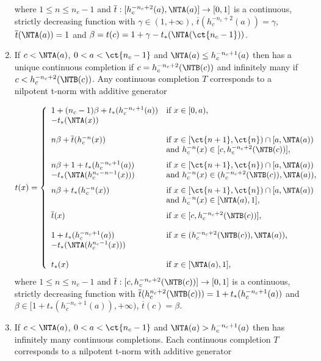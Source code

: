 \begin{theorem}
\begin{enumerate}[label=(\roman*)]
\begin{equation}
		\end{equation}
		where $1\leq n \leq n_c-1$ and $\overline{t}:[h_c^{-n_c+2}(a),\NTA(a)] \to [0,1]$ is a continuous, strictly decreasing function with $\gamma \in (1,+\infty)$, $\overline{t}(h_c^{-n_c+2}(a))=\gamma$, $\overline{t}(\NTA(a))=1$ and $\beta= t(c)= 1 + \gamma - t_*(\NTA(\ct{n_c-1}))$.
		\newline
		\item If $c< \NTA(a)$, $0<a<\ct{n_c-1}$ and $\NTA(a) \leq h_c^{-n_c+1}(a)$ then \TB has a unique continuous completion if $c=h_c^{-n_c+2}(\NTB(c))$ and infinitely many if $c < h_c^{-n_c+2}(\NTB(c))$. Any continuous completion $T$ corresponds to a nilpotent t-norm with additive generator
		
		\begin{equation}\label{eq:GeneratorCompletion(a,1)c-4}
			t(x)
			=
			\left\{ \begin{array}{ll}
				1+(n_c-1)\beta + t_*(h_c^{-n_c+1}(a))  & \text{if } x \in [0,a), \\
				 - t_*(\NTA(x))  & \\
				& \\
				n \beta + \overline{t}(h_c^{-n}(x))  & \text{if } x \in [\ct{n+1},\ct{n}) \cap [a,\NTA(a)) \\
				& \text{and } h_c^{-n}(x) \in [c,h_c^{-n_c+2}(\NTB(c))], \\[7pt]
				n \beta + 1 + t_*(h_c^{-n_c+1}(a))  & \text{if } x \in [\ct{n+1},\ct{n}) \cap [a,\NTA(a))\\
				- t_*(\NTA(h_c^{n_c-n-1}(x)))& \text{and } h_c^{-n}(x) \in (h_c^{-n_c+2}(\NTB(c)),\NTA(a)), \\[7pt]
				n \beta + t_*(h_c^{-n}(x))  & \text{if } x \in [\ct{n+1},\ct{n}) \cap [a,\NTA(a))\\
				& \text{and } h_c^{-n}(x) \in [\NTA(a),1], \\[7pt]
				\overline{t}(x) & \text{if } x \in [c,h_c^{-n_c+2}(\NTB(c))], \\
				& \\
				1+t_*(h_c^{-n_c+1}(a)) & \text{if } x \in (h_c^{-n_c+2}(\NTB(c)),\NTA(a)),\\
				-t_*(\NTA(h_c^{n_c-1}(x))) & \\
				& \\
				t_{*}(x) & \text{if } x \in [\NTA(a),1],
			\end{array} \right.
		\end{equation}	
		\newpage	
		where $1\leq n \leq n_c-1$ and $\overline{t}:[c,h_c^{-n_c+2}(\NTB(c))] \to [0,1]$ is a continuous, strictly decreasing function with  $\overline{t}(h_c^{n_c+2}(\NTB(c))) = 1 + t_*(h_c^{-n_c+1}(a))$ and $\beta \in [1 + t_*(h_c^{-n_c+1}(a)),+\infty)$, $\overline{t}(c) = \beta$.	
		\item If $c < \NTA(a)$, $0<a<\ct{n_c-1}$ and $\NTA(a) > h_c^{-n_c+1}(a)$ then \TB has infinitely many continuous completions. Each continuous completion $T$ corresponds to a nilpotent t-norm with additive generator
		

\end{enumerate}
\end{theorem}
